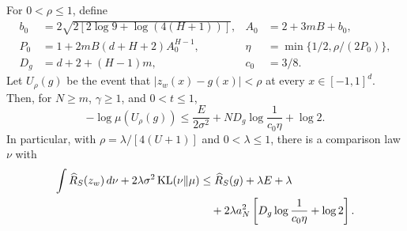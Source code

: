 \begin{lemma}
\label{lem:effective-teacher-tube}
For $0<\rho\leq1$, define
\begin{align*}
 b_0&=2\sqrt{2[2\log9+\log(4(H+1))]},
 & A_0&=2+3mB+b_0,\\
 P_0&=1+2mB(d+H+2)A_0^{H-1},
 & \eta&=\min\{1/2,\rho/(2P_0)\},\\
 D_g&=d+2+(H-1)m,
 & c_0&=3/8.
\end{align*}
Let $U_\rho(g)$ be the event that $|z_w(x)-g(x)|<\rho$ at every
$x\in[-1,1]^d$.  Then, for $N\geq m$, $\gamma\geq1$, and $0<t\leq1$,
\begin{equation}
 -\log\mu(U_\rho(g))
 \leq\frac E{2\sigma^2}+ND_g\log\frac1{c_0\eta}+\log2.
 \label{eq:effective-teacher-tube}
\end{equation}
In particular, with $\rho=\lambda/[4(U+1)]$ and $0<\lambda\leq1$,
there is a comparison law $\nu$ with
\begin{align}
 \int\widehat R_S(z_w)\,d\nu
    +2\lambda\sigma^2\operatorname{KL}(\nu\Vert\mu)
 &\leq\widehat R_S(g)+\lambda E+\lambda
 \notag\\
 &\quad+2\lambda a_N^2
       \left[D_g\log\frac1{c_0\eta}+\log2\right].
 \label{eq:effective-comparison}
\end{align}
\end{lemma}
